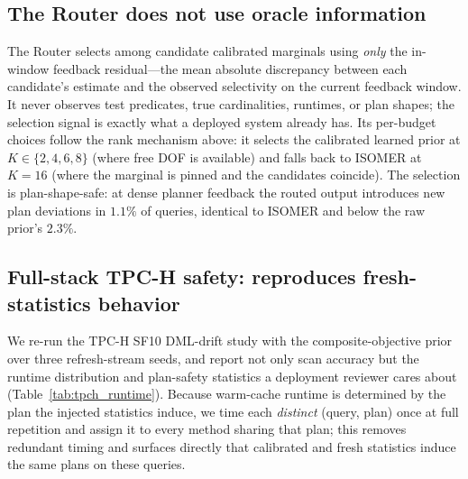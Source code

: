 \subsection{The Router does not use oracle information}
\label{sec:mr-router}

The Router selects among candidate calibrated marginals using \emph{only} the
in-window feedback residual---the mean absolute discrepancy between each
candidate's estimate and the observed selectivity on the current feedback
window. It never observes test predicates, true cardinalities, runtimes, or plan
shapes; the selection signal is exactly what a deployed system already has. Its
per-budget choices follow the rank mechanism above: it selects the calibrated
learned prior at $K\in\{2,4,6,8\}$ (where free DOF is available) and falls back
to ISOMER at $K{=}16$ (where the marginal is pinned and the candidates coincide).
The selection is plan-shape-safe: at dense planner feedback the routed output
introduces new plan deviations in $1.1\%$ of queries, identical to ISOMER and
below the raw prior's $2.3\%$.

\subsection{Full-stack TPC-H safety: reproduces fresh-statistics behavior}
\label{sec:mr-tpch}

We re-run the TPC-H SF10 DML-drift study with the composite-objective prior over
three refresh-stream seeds, and report not only scan accuracy but the runtime
distribution and plan-safety statistics a deployment reviewer cares about
(Table~\ref{tab:tpch_runtime}). Because warm-cache runtime is determined by the
plan the injected statistics induce, we time each \emph{distinct} (query, plan)
once at full repetition and assign it to every method sharing that plan; this
removes redundant timing and surfaces directly that calibrated and fresh
statistics induce the same plans on these queries.

